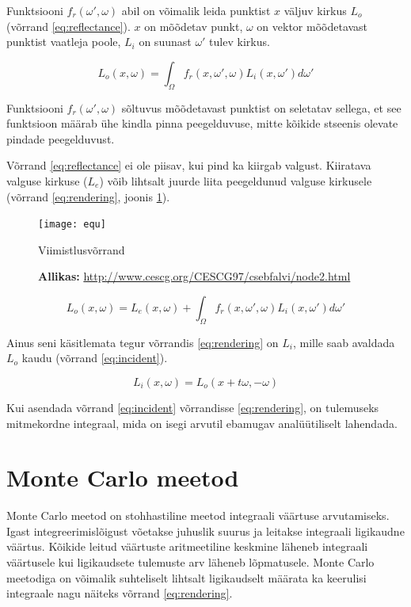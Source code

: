\documentclass[a4paper,12pt]{report}
\begin{document}
Funktsiooni \(f_r(\omega', \omega)\) abil on võimalik leida punktist \(x\)
väljuv kirkus \(L_o\) (võrrand \ref{eq:reflectance}). \(x\) on mõõdetav
punkt, \(\omega\) on vektor mõõdetavast punktist vaatleja poole,
\(L_i\) on suunast \(\omega'\) tulev kirkus.

\begin{equation} \label{eq:reflectance}
L_o(x, \omega) = \int_\Omega f_r(x, \omega', \omega) L_i(x, \omega') d\omega'
\end{equation}

Funktsiooni \(f_r(\omega', \omega)\) sõltuvus mõõdetavast punktist on
seletatav sellega, et see funktsioon määrab ühe kindla pinna
peegelduvuse, mitte kõikide stseenis olevate pindade peegelduvust.

Võrrand \ref{eq:reflectance} ei ole piisav, kui pind ka kiirgab valgust.
Kiiratava valguse kirkuse (\(L_e\)) võib lihtsalt juurde liita peegeldunud valguse
kirkusele (võrrand \ref{eq:rendering}, joonis \ref{fig:equation}).

\begin{figure}[h]
\centering
\texttt{[image: equ]}
\caption{Viimistlusvõrrand}
\caption*{\textbf{Allikas:} \url{http://www.cescg.org/CESCG97/csebfalvi/node2.html}}
\label{fig:equation}
\end{figure}

\begin{equation} \label{eq:rendering}
L_o(x, \omega) = L_e(x, \omega) + \int_\Omega f_r(x, \omega', \omega) L_i(x, \omega') d\omega'
\end{equation}

Ainus seni käsitlemata tegur võrrandis \ref{eq:rendering} on \(L_i\),
mille saab avaldada \(L_o\) kaudu (võrrand \ref{eq:incident}). 

\begin{equation} \label{eq:incident}
L_i(x, \omega) = L_o(x + t\omega, -\omega)
\end{equation}

Kui asendada võrrand \ref{eq:incident} võrrandisse \ref{eq:rendering},
on tulemuseks mitmekordne integraal, mida on isegi arvutil ebamugav
analüütiliselt lahendada.

\section{Monte Carlo meetod}
Monte Carlo meetod on stohhastiline meetod integraali väärtuse arvutamiseks.
Igast integ\-ree\-ri\-mis\-lõi\-gust võetakse juhuslik suurus ja leitakse integraali
ligikaudne väärtus. Kõikide leitud väärtuste aritmeetiline keskmine
läheneb integraali väärtusele kui ligikaudsete tulemuste arv läheneb
lõpmatusele. Monte Carlo meetodiga on võimalik suhteliselt lihtsalt
ligikaudselt määrata ka keerulisi integraale nagu näiteks võrrand \ref{eq:rendering}.
\end{document}
